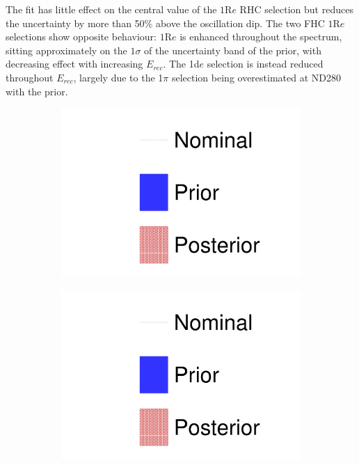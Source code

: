 The fit has little effect on the central value of the $1\text{R}e$ RHC selection but reduces the uncertainty by more than 50\% above the oscillation dip. The two FHC $1\text{R}e$ selections show opposite behaviour: $1\text{R}e$ is enhanced throughout the spectrum, sitting approximately on the $1\sigma$ of the uncertainty band of the prior, with decreasing effect with increasing $E_{rec}$. The 1d$e$ selection is instead reduced throughout $E_{rec}$, largely due to the 1$\pi$ selection being overestimated at ND280 with the prior.
\begin{figure}[h]
	\begin{subfigure}[t]{0.32\textwidth}
		\includegraphics[width=\textwidth, trim={0mm 0mm 0mm 0mm}, clip, page=1]{figures/mach3/data/prior_error_1june_try_2017_fit_on_sk_spectra}
	\end{subfigure}
	\begin{subfigure}[t]{0.32\textwidth}
		\includegraphics[width=\textwidth, trim={0mm 0mm 0mm 0mm}, clip, page=5]{figures/mach3/data/prior_error_1june_try_2017_fit_on_sk_spectra}

\end{subfigure}
\end{figure}
